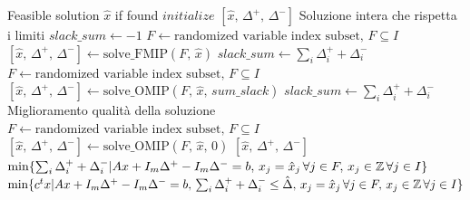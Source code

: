 \begin{algorithm}
    \caption{Alternating Criteria Search} \label{alg:acs}
    \begin{algorithmic}
        \Ensure Feasible solution $\hat x$ if found
        \State $initialize \,\,[\hat x,\, \Delta^+,\, \Delta^-]$ \Comment Soluzione intera che rispetta i limiti
        \State $slack\_sum \gets -1$
        \State $F \gets \text{randomized variable index subset, } F\subseteq I$
        \State $[\hat x,\, \Delta^+,\, \Delta^-] \gets \text{solve\_FMIP}(F,\,\hat x)$
        \State $slack\_sum\gets \sum_i \Delta^+_i + \Delta^-_i$
        \State $F \gets \text{randomized variable index subset, } F\subseteq I$
        \State $[\hat x,\, \Delta^+,\, \Delta^-] \gets \text{solve\_OMIP}(F,\,\hat x,\,sum\_slack)$
        \State $slack\_sum\gets \sum_i \Delta^+_i + \Delta^-_i$
        \EndWhile
         \Comment Miglioramento qualità della soluzione
        \State $F \gets \text{randomized variable index subset, } F\subseteq I$
        \State $[\hat x,\, \Delta^+,\, \Delta^-] \gets \text{solve\_OMIP}(F,\,\hat x,\,0)$
        \EndWhile
        \EndIf
        \State \Return $[\hat x,\, \Delta^+,\, \Delta^-]$
        \State
        \State \Return $\min \{\sum_i \Delta_i^+ + \Delta_i^- | Ax + I_m\Delta^+ - I_m\Delta^- = b,\, x_j = \hat x_j\, \forall j\in F,\, x_j\in\mathbb{Z}\,\forall j\in I\}$
        \EndFunction
        \State
        \State \Return $\min \{c^t x | Ax + I_m\Delta^+ - I_m\Delta^- = b,\, \sum_i \Delta_i^+ + \Delta_i^- \leq \hat \Delta,\,x_j = \hat x_j\, \forall j\in F,\, x_j\in\mathbb{Z}\,\forall j\in I\}$
        \EndFunction
    \end{algorithmic}
\end{algorithm}

